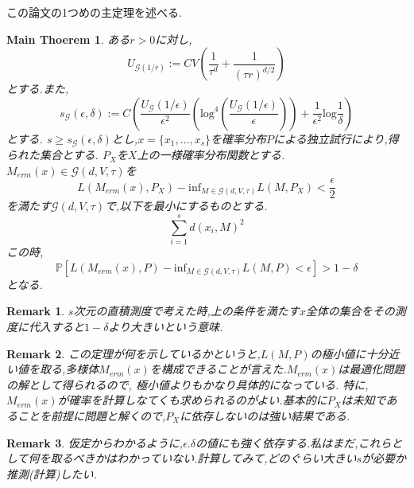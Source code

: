 \documentclass{ujarticle}
\newtheorem*{rem}{Remark}
\newtheorem{mtm}{Main Thoerem}
\begin{document}
この論文の1つめの主定理を述べる.
\begin{mtm}
\label{mth1}
 ある$r > 0$に対し,
 \begin{equation*}
  U_{\mathcal{G}(1/r)}:=CV( \frac{ 1 }{ \tau^d } + \frac{ 1 }{ (\tau r)^{d/2} } )
 \end{equation*}
 とする.また,
 \begin{equation*}
  s_{\mathcal{G}}(\epsilon,\delta):=C(\frac{ U_{\mathcal{G}}(1/\epsilon) }{ \epsilon^2 }(\mathrm{log}^4
  (\frac{U_{\mathcal{G}}(1/\epsilon)}{\epsilon})) + \frac{ 1 }{ \epsilon^2 }\mathrm{log}\frac{ 1 }{ \delta }  )
 \end{equation*}
とする.
$s \ge s_{\mathcal{G}}(\epsilon,\delta)$とし,$x=\{ x_1,\dots,x_s\}$を確率分布$P$による独立試行により,得られた集合とする.
$P_X$を$X$上の一様確率分布関数とする.
$M_{erm}(x) \in \mathcal{G}(d,V,\tau)$を
\begin{equation*}
 L(M_{erm}(x),P_X) - \mathrm{inf}_{M \in \mathcal{G}(d,V,\tau)} L(M,P_X) < \frac{ \epsilon }{ 2 }
\end{equation*}
を満たす$\mathcal{G}(d,V,\tau)$で,以下を最小にするものとする.
\begin{equation*}
 \sum_{i=1}^sd(x_i,M)^2
\end{equation*}
この時,
\begin{equation*}
 \mathbb{P}[L(M_{erm}(x),P) - \mathrm{inf}_{M \in \mathcal{G}(d,V,\tau)} L(M,P) < \epsilon] > 1- \delta
\end{equation*}
となる.
\end{mtm}
\begin{rem}
 $s$次元の直積測度で考えた時,上の条件を満たす$x$全体の集合をその測度に代入すると$1- \delta$より大きいという意味.
\end{rem}
\begin{rem}
 この定理が何を示しているかというと,$L(M,P)$の極小値に十分近い値を取る,多様体$M_{erm}(x)$を構成できることが言えた.$M_{erm}(x)$は最適化問題の解として得られるので,
 極小値よりもかなり具体的になっている.
 特に,$M_{erm}(x)$が確率を計算しなてくも求められるのがよい.基本的に$P_X$は未知であることを前提に問題と解くので,$P_X$に依存しないのは強い結果である.
\end{rem}
\begin{rem}
  仮定からわかるように,$\epsilon.\delta$の値にも強く依存する.私はまだ,これらとして何を取るべきかはわかっていない.計算してみて,どのぐらい大きい$s$が必要か推測(計算)したい.
\end{rem}
\end{document}
